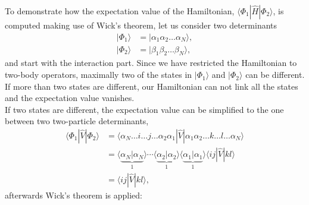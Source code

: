 To demonstrate how the expectation value of the Hamiltonian, $\langle\Phi_1|\hat{H}|\Phi_2\rangle$, is computed making use of Wick's theorem, let us consider two determinants
\begin{align*}
|\Phi_1\rangle &= |\alpha_1\alpha_2\dots\alpha_N\rangle,\\
|\Phi_2\rangle &= |\beta_1\beta_2\dots\beta_N\rangle,
\end{align*}
and start with the interaction part. Since we have restricted the Hamiltonian to two-body operators, maximally two of the states in $|\Phi_1\rangle$ and $|\Phi_2\rangle$ can be different. If more than two states are different, our Hamiltonian can not link all the states and the expectation value vanishes. \\
If two states are different, the expectation value can be simplified to the one between two two-particle determinants,
\begin{align*}
\langle \Phi_1 | \hat{V}|\Phi_2\rangle &= \langle \alpha_N \dots i \dots j \dots \alpha_2\alpha_1 |\hat{V}|\alpha_1\alpha_2 \dots k \dots l \dots \alpha_N\rangle \\
&= \langle\underbrace{\alpha_N|\alpha_N}_1\rangle\cdots \langle\underbrace{\alpha_2|\alpha_2}_1\rangle\langle\underbrace{\alpha_1|\alpha_1}_1\rangle\langle i j |\hat{V}| k l\rangle \\
&= \langle i j | \hat{V}| k l\rangle, 
\end{align*}
afterwards Wick's theorem is applied:

